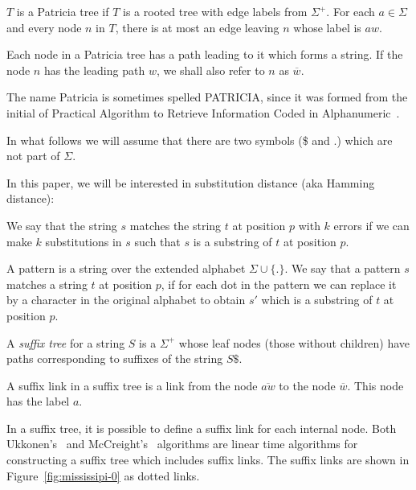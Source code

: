 \begin{definition}
$T$ is a Patricia tree if $T$ is a rooted tree with edge labels from $\Sigma^+$. For each $a \in \Sigma$ and every node $n$ in $T$, there is at most an edge leaving $n$ whose label is $aw$.

Each node in a Patricia tree has a path leading to it which forms a string. If the node $n$ has the leading path $w$, we shall also refer to $n$ as $\overline{w}$.
\end{definition}

The name Patricia is sometimes spelled PATRICIA, since it was formed from the initial of Practical Algorithm to Retrieve Information Coded in Alphanumeric~\cite{morrison:patricia}.

In what follows we will assume that there are two symbols (\$ and $.$) which are not part of $\Sigma$.

In this paper, we will be interested in substitution distance (aka Hamming distance):

\begin{definition}
We say that the string $s$ matches the string $t$ at position $p$ with $k$ errors if we can make $k$ substitutions in $s$ such that $s$ is a substring of $t$ at position $p$.
\end{definition}


\begin{definition}[Pattern]
A pattern is a string over the extended alphabet $\Sigma\cup\{.\}$. We say that a pattern $s$ matches a string $t$ at position $p$, if for each dot in the pattern we can replace it by a character in the original alphabet to obtain $s'$ which is a substring of $t$ at position $p$.
\end{definition}

\begin{definition}
A \emph{suffix tree} for a string $S$ is a $\Sigma^+$ whose leaf nodes (those without children) have paths corresponding to suffixes of the string $S\$ $.
\end{definition}

\begin{definition}
A suffix link in a suffix tree is a link from the node $\overline{aw}$ to the node $\overline{w}$. This node has the label $a$.
\end{definition}

In a suffix tree, it is possible to define a suffix link for each internal node. Both Ukkonen's~\cite{ukkonen} and McCreight's~\cite{mccreight} algorithms are linear time algorithms for constructing a suffix tree which includes suffix links. The suffix links are shown in Figure~\ref{fig:mississipi-0} as dotted links.

